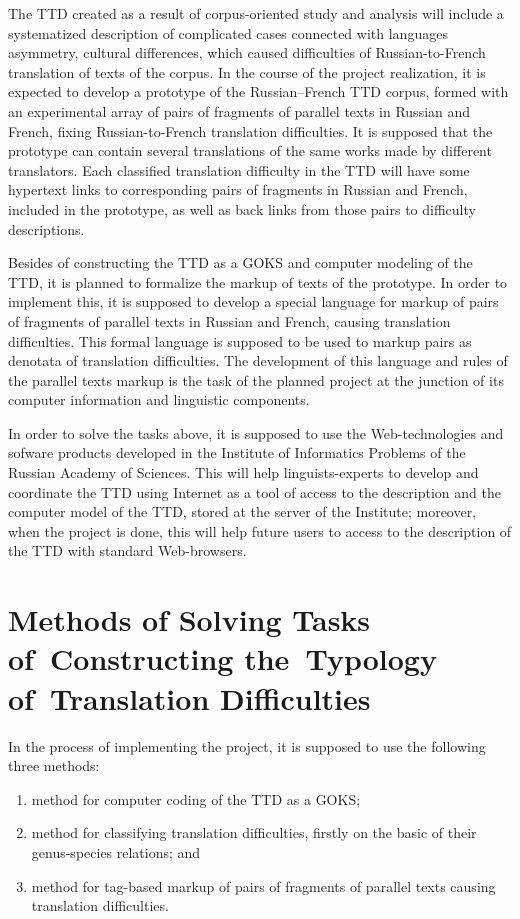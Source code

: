 \begin{multicols}{2}
   The TTD created as a result of corpus-oriented study and analysis will include a systematized 
description of complicated cases connected with languages asymmetry, cultural differences, 
which caused difficulties of Russian-to-French translation of texts of the corpus. In the course of 
the project realization, it is expected to develop a prototype of the Russian--French TTD corpus, 
formed with an experimental array of pairs of fragments of parallel texts in Russian and French, 
fixing Russian-to-French translation difficulties. It is supposed that the prototype can contain several 
translations of the same works made by different translators. Each classified translation difficulty in 
the TTD will have some hypertext links to corresponding pairs of fragments in Russian and 
French, included in the prototype, as well as back links from those pairs to difficulty 
descriptions.
   
   Besides of constructing the TTD as a GOKS and computer modeling of the TTD, it is 
planned to formalize the markup of texts of the prototype. In order to implement this, it is 
supposed to develop a special language for markup of pairs of fragments of parallel texts in 
Russian and French, causing translation difficulties. This formal language is supposed to be used 
to markup pairs as denotata of translation difficulties. The development of this language and rules 
of the parallel texts markup is the task of the planned project at the junction of its computer 
information and linguistic components.
   
   In order to solve the tasks above, it is supposed to use the Web-technologies and sofware 
products developed in the Institute of Informatics Problems of the Russian Academy of Sciences. 
This will help linguists-experts to develop and coordinate the TTD using Internet as a tool of 
access to the description and the computer model of the TTD, stored at the server of the Institute; 
moreover, when the project is done, this will help future users to access to the description of the 
TTD with standard Web-browsers.

\section{Methods of Solving Tasks of~Constructing the~Typology of~Translation Difficulties}

\noindent
In the process of implementing the project, it is supposed to use the following three methods:
   \begin{enumerate}[(1)]
\item method for computer coding of the TTD as a GOKS;
\item method for classifying translation difficulties, firstly on the basic of their 
genus-species relations; and
\item method for tag-based markup of pairs of fragments of parallel texts causing 
translation difficulties.
\end{enumerate}


\end{multicols}
